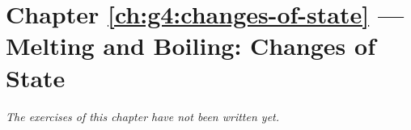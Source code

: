 \section*{Chapter \ref{ch:g4:changes-of-state} --- Melting and Boiling: Changes of State}


\emph{The exercises of this chapter have not been written yet.}
